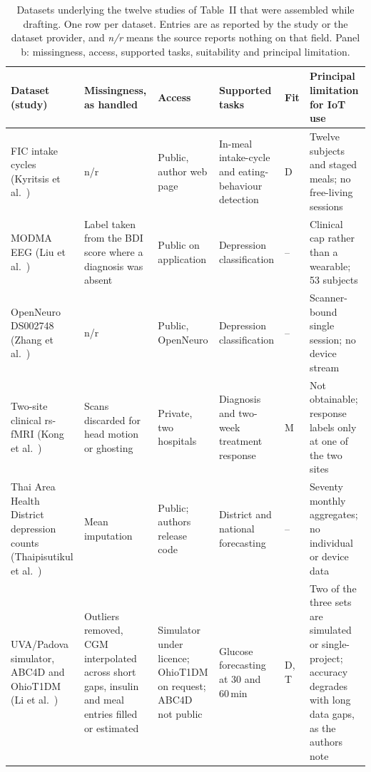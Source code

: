 \documentclass[journal]{IEEEtran}
\renewcommand{\thetable}{S\arabic{table}}
\begin{document}
\begin{table}[tbp]
\centering
\addtocounter{table}{-1}
\renewcommand{\thetable}{S2b}
\caption{Datasets underlying the twelve studies of Table~II that were assembled while drafting.
One row per dataset. Entries are as reported by the study or the dataset provider, and
\emph{n/r} means the source reports nothing on that field. Panel b: missingness, access, supported tasks, suitability and principal limitation.}
\label{tab:S2b}
\footnotesize
\setlength{\tabcolsep}{2.5pt}
\renewcommand{\arraystretch}{1.05}
\begin{tabularx}{\textwidth}{L{2.5cm} L{3.4cm} L{2.2cm} L{2.9cm} L{0.75cm} X}
\toprule
\textbf{Dataset (study)} & \textbf{Missingness, as handled} & \textbf{Access} & \textbf{Supported tasks} & \textbf{Fit} & \textbf{Principal limitation for IoT use} \\
\midrule
FIC intake cycles (Kyritsis et al.~\cite{Kyritsis2019EatingBehavior}) & n/r & Public, author web page & In-meal intake-cycle and eating-behaviour detection & D & Twelve subjects and staged meals; no free-living sessions \\
\addlinespace[1pt]
MODMA EEG (Liu et al.~\cite{2}) & Label taken from the BDI score where a diagnosis was absent & Public on application & Depression classification & -- & Clinical cap rather than a wearable; 53 subjects \\
\addlinespace[1pt]
OpenNeuro DS002748 (Zhang et al.~\cite{9}) & n/r & Public, OpenNeuro & Depression classification & -- & Scanner-bound single session; no device stream \\
\addlinespace[1pt]
Two-site clinical rs-fMRI (Kong et al.~\cite{4}) & Scans discarded for head motion or ghosting & Private, two hospitals & Diagnosis and two-week treatment response & M & Not obtainable; response labels only at one of the two sites \\
\addlinespace[1pt]
Thai Area Health District depression counts (Thaipisutikul et al.~\cite{3}) & Mean imputation & Public; authors release code & District and national forecasting & -- & Seventy monthly aggregates; no individual or device data \\
\addlinespace[1pt]
UVA/Padova simulator, ABC4D and OhioT1DM (Li et al.~\cite{Li2020GluNet}) & Outliers removed, CGM interpolated across short gaps, insulin and meal entries filled or estimated & Simulator under licence; OhioT1DM on request; ABC4D not public & Glucose forecasting at 30 and 60\,min & D, T & Two of the three sets are simulated or single-project; accuracy degrades with long data gaps, as the authors note \\

\end{tabularx}
\end{table}
\end{document}
